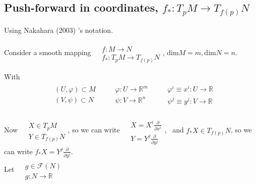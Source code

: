 \documentclass[10pt]{amsart}
\begin{document}
\begin{multicols*}{2}
\subsection{Push-forward in coordinates, $f_*  : T_p M \to T_{f(p)}N$}

Using Nakahara (2003) \cite{Naka2003}'s notation.

Consider a smooth mapping $\begin{aligned} & \quad \\ 
		& f : M \to N \\
		& f_* : T_p M \to T_{f(p)}N \end{aligned}$, $\text{dim}M = m, \text{dim}N = n$.
	
With
\[
\begin{gathered}
\begin{aligned}
	& (U, \varphi) \subset M \\
	& (V, \psi) \subset N
\end{aligned} \quad \, \begin{aligned}
& \varphi: U \to \mathbb{R}^m \\
& \psi: V \to \mathbb{R}^n 
\end{aligned} \quad \, \begin{aligned}
& \varphi^i \equiv x^i : U \to \mathbb{R} \\ 
& \psi^j \equiv y^j : V \to \mathbb{R} 
\end{aligned}
\end{gathered}
\]

Now $\begin{aligned} & \quad \\ 
	& X \in T_p M \\ 
	& Y \in T_{f(p)} N \end{aligned}$, so we can write $\begin{aligned} & \quad \\ 
	& X = X^i \frac{\partial }{ \partial x^i} \\ 
	& Y = Y^j \frac{ \partial }{ \partial y^j } \end{aligned}$, \, and $f_* X \in T_{f(p)}N$, so we can write $f_* X = Y^j \frac{\partial }{ \partial y^j}$. \\

Let $\begin{aligned} & \quad \\ 
	 & g\in \mathcal{F}(N) \\
	 & g: N \to \mathbb{R} \end{aligned}$ \\
 

\end{multicols*}
\end{document}
